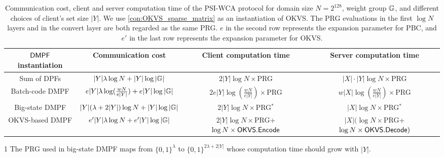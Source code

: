 \begin{table*}
  \renewcommand\arraystretch{1.5}
  \begin{threeparttable}
  \caption{Communication cost, client and server computation time of the PSI-WCA protocol for domain size $N = 2^{128}$, weight group $\mathbb{G}$, and  different choices of client's set size $|Y|$. We use \cref{con:OKVS_sparse_matrix} as an instantiation of OKVS. The PRG evaluations in the first $\log N$ layers and in the convert layer are both regarded as the same PRG. $e$ in the second row represents the expansion parameter for PBC, and $e'$ in the last row represents the expansion parameter for OKVS. }
\label{tab:PSI_plug_in_formula}
  \begin{tabular}{cccc}
          \toprule
    ${\sf DMPF}$ instantiation & Communication cost & Client computation time & Server computation time \\
          \midrule

          Sum of DPFs & $|Y|\lambda\log N+|Y|\log|\mathbb{G}|$ & $2|Y|\log N\times $PRG & $|X|\cdot |Y|\log N\times $PRG\\

          Batch-code DMPF & $e|Y|\lambda\log(\frac{wN}{e|Y|})+e|Y|\log|\mathbb{G}|$ & $2e|Y|\log(\frac{wN}{e|Y|})\times$PRG & $w|X|\log(\frac{wN}{e|Y|})\times$PRG\\

          Big-state DMPF & $|Y|(\lambda+2|Y|)\log N+|Y|\log|\mathbb{G}|$ & $2|Y|\log N\times $PRG$^*$\tnote{1} & $|X|\log N \times$PRG$^*$\\

          OKVS-based DMPF& $e'|Y|\lambda\log N +e'|Y|\log|\mathbb{G}|$ & $2|Y|\log N\times$PRG+$\log N\times {\sf OKVS}.{\sf Encode}$ & $|X|(\log N\times$PRG+$\log N\times {\sf OKVS}.{\sf Decode})$\\
          \bottomrule
  \end{tabular}
  \begin{tablenotes}
    \item [1] The PRG used in big-state DMPF maps from $\{0,1\}^\lambda$ to $\{0,1\}^{2\lambda+2|Y|}$ whose computation time should grow with $|Y|$.
  \end{tablenotes}
\end{threeparttable}
\end{table*}

